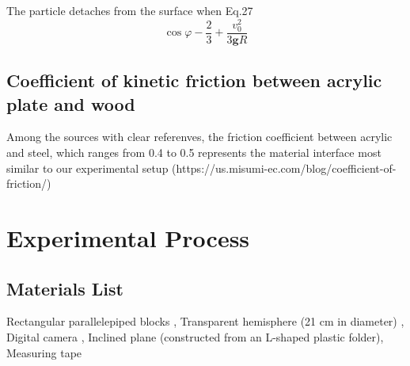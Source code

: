 \documentclass[11pt,letterpaper]{article}
\begin{document}
The particle detaches from the surface when Eq.27
\begin{equation}
    \cos\varphi - \frac{2}{3}+\frac{v_0^2}{3\mathbf g R}
\tag{27}
\end{equation}

\subsection{Coefficient of kinetic friction between acrylic plate and wood}
Among the sources with clear referenves, the friction coefficient between acrylic and steel, which ranges from 0.4 to 0.5 represents the material interface most similar to our experimental setup
(https://us.misumi-ec.com/blog/coefficient-of-friction/)

\section{Experimental Process}

\subsection{Materials List }
Rectangular parallelepiped blocks , Transparent hemisphere (21 cm in diameter) , Digital camera , Inclined plane (constructed from an L-shaped plastic folder),  Measuring tape
\end{document}
